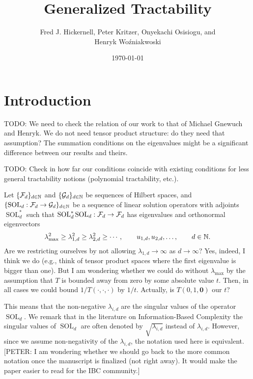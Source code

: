 \documentclass[11pt,a4paper]{article}
\DeclareMathOperator{\SOL}{SOL}
\newcommand{\fred}[1]{\begingroup\color{blue}#1\endgroup}
\newcommand{\peter}[1]{\begingroup\color{purple}#1\endgroup}
\newcommand{\kachi}[1]{\begingroup\color{ForestGreen}#1\endgroup}
\begin{document}
\newtheorem{theorem}{Theorem}
\theoremstyle{definition}
\newtheorem{definition}{Definition}
\newtheorem{example}{Example}

\title{Generalized Tractability}
\author{\fred{Fred J. Hickernell}, \peter{Peter Kritzer}, \kachi{Onyekachi Osisiogu}, and \\ Henryk Wo\'zniakwoski}
\date{\today}

\maketitle

\section{Introduction}

TODO: We need to check the relation of our work to that of Michael Gnewuch and Henryk. We do not need tensor product structure: do they need that assumption? The summation conditions on the eigenvalues might be a significant difference between our results and theirs.

\medskip

TODO: Check in how far our conditions coincide with existing conditions for less general tractability notions (polynomial tractability, etc.).

\medskip

Let $\{\mathcal{F}_d\}_{d \in \mathbb{N}}$ and $\{\mathcal{G}_d\}_{d \in \mathbb{N}}$ be sequences of Hilbert spaces, and $\{\SOL_d : \cf_d \to \cg_d\}_{d \in \naturals}$ be a sequence of linear solution operators  with adjoints $\SOL_d^*$ such that $\SOL_d^*\SOL_d : \cf_d \to \cf_d$ has eigenvalues and orthonormal eigenvectors
\begin{equation} \label{eq:eigenvalues}
\lambda_{\max}^2 \ge \lambda_{1,d}^2 \ge \lambda_{2,d}^2 \ge \cdots, \qquad u_{1,d}, u_{2,d}, \ldots, \qquad d \in \mathbb{N}.
\end{equation}
\fred{Are we restricting ourselves by not allowing $\lambda_{1,d} \to \infty$ as $d \to \infty$?}
\peter{Yes, indeed, I think we do (e.g., think of tensor product spaces where the first eigenvalue is bigger than one). But I am wondering whether we could do without $\lambda_{\max}$ by the assumption that $T$ is bounded away from zero by some absolute value $t$. Then, in all cases we could bound $1/T(\cdot,\cdot,\cdot)$ by $1/t$. Actually, is $T(0,1,\boldsymbol{0})$ our $t$?}

This means that the non-negative $\lambda_{i,d}$ are the singular values of the operator $\SOL_d$. We remark that in the literature on Information-Based Complexity the singular values of $\SOL_d$ are often denoted by $\sqrt{\lambda_{i,d}}$ instead of $\lambda_{i,d}$. However, since we assume non-negativity of the $\lambda_{i,d}$, the notation used here is equivalent. 
\peter{[PETER: I am wondering whether we should go back to the more common notation once the manuscript is finalized (not right away). It would make the paper easier to read for the IBC community.]}
\end{document}
